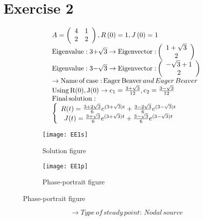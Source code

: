 \documentclass[a4paper]{article}
\begin{document}
\section{Exercise 2}
	\[\begin{array}{l}
A = \left( {\begin{array}{*{20}{c}}
4&1\\
2&2
\end{array}} \right),R\left( 0 \right) = 1,J\left( 0 \right) = 1\\
{\rm{Eigenvalue:3 + }}\sqrt 3  \to {\rm{Eigenvector:}}\left( {\begin{array}{*{20}{c}}
{1 + \sqrt 3 }\\
2
\end{array}} \right)\\
{\rm{Eigenvalue:3 - }}\sqrt 3  \to {\rm{Eigenvector:}}\left( {\begin{array}{*{20}{c}}
{ - \sqrt 3  + 1}\\
2
\end{array}} \right)\\
 \to {\rm{Name}}\,{\rm{of}}\,{\rm{case:}}\,{\rm{Eager}}\,{\rm{Beaver}}\,and\,Eager\,Beaver\\
{\rm{Using}}\,{\rm{R(0), J(0)}} \to {{\rm{c}}_1} = \frac{{3 + \sqrt 3 }}{{12}},{\rm{ }}{{\rm{c}}_2} = \frac{{3 - \sqrt 3 }}{{12}}\\
{\rm{Final}}\,{\rm{solution:}}\\
\left\{ {\begin{array}{*{20}{c}}
{R(t) = \frac{{3 + 2\sqrt 3 }}{6}{e^{(3 + \sqrt 3 )t}} + \frac{{3 - 2\sqrt 3 }}{6}{e^{(3 - \sqrt 3 )t}}}\\
{J(t) = \frac{{3 + \sqrt 3 }}{6}{e^{(3 + \sqrt 3 )t}} + \frac{{3 - \sqrt 3 }}{6}{e^{(3 - \sqrt 3 )t}}}
\end{array}} \right.
\end{array}\]
\begin{figure}[H]
\centering
\begin{subfigure}{.5\textwidth}
  \centering
  \texttt{[image: EE1s]}
  \caption*{Solution figure}
\end{subfigure}%
\begin{subfigure}{.5\textwidth}
  \centering
  \texttt{[image: EE1p]}
  \caption*{Phase-portrait figure}
\end{subfigure}
\end{figure}
\[  \to  Type\,of\,steady\,point:\,Nodal\,source\]
\end{document}
